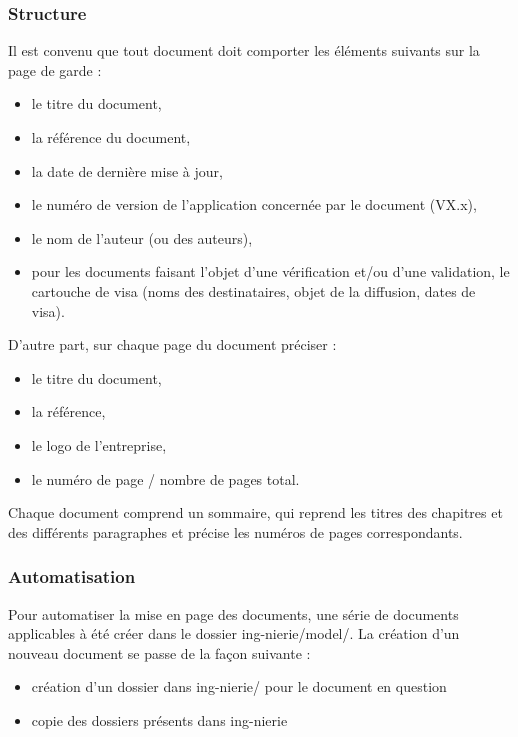     \subsubsection{Structure} 
      \par Il est convenu que tout document doit comporter les éléments suivants sur la page de garde : \\
      \begin{itemize}
        \item le titre du document,
        \item la référence du document,
        \item la date de dernière mise à jour,
        \item le numéro de version de l'application concernée par le document (VX.x),
        \item le nom de l’auteur (ou des auteurs),
        \item pour les documents faisant l'objet d'une vérification et/ou d'une validation, le cartouche de visa (noms des destinataires, objet de la diffusion, dates de visa).\\
      \end{itemize}                                                                                                        
      D’autre part, sur chaque page du document préciser : \\
      \begin{itemize}
        \item le titre du document,
        \item la référence,
        \item le logo de l'entreprise,
        \item le numéro de page / nombre de pages total.
      \end{itemize}         
      
      Chaque document comprend un sommaire, qui reprend les titres des chapitres et des différents paragraphes et précise les numéros de pages correspondants.
    
    \subsubsection{Automatisation}
    Pour automatiser la mise en page des documents, une série de documents applicables à été créer dans le dossier ing-nierie/model/. 
    La création d'un nouveau document se passe de la façon suivante : 
    \begin{itemize}
      \item création d'un dossier dans ing-nierie/ pour le document en question
      \item copie des dossiers présents dans ing-nierie 
    \end{itemize}  
